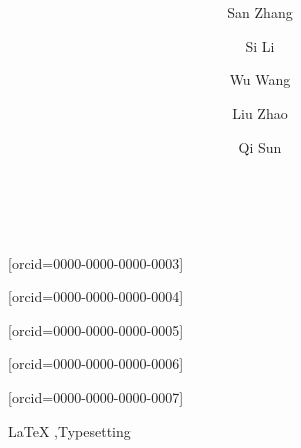 \documentclass[a4paper,fleqn]{cas-dc}
\begin{document}
\title[mode=title]{\ }

\author[1,2,3]{San Zhang}[orcid=0000-0000-0000-0003]\fnmark[1]

\author[1,2]{Si Li}[orcid=0000-0000-0000-0004]\fnmark[1]

\author[1]{Wu Wang}[orcid=0000-0000-0000-0005]

\author[1]{Liu Zhao}[orcid=0000-0000-0000-0006]\cormark[1]

\author[1]{Qi Sun}[orcid=0000-0000-0000-0007]\cormark[1]

\address[1]{Department/College/School/Faculty/Institute/... A, University A, City A, Country/Region A}
\address[2]{Department/College/School/Faculty/Institute/... B, University B, City B, Country/Region B}
\address[3]{Department/College/School/Faculty/Institute/... C, University C, City C, Country/Region C}


\begin{abstract}
	\ 
\end{abstract}

\begin{keywords}
	LaTeX \sep Typesetting
\end{keywords}

\maketitle








\printcredits



\end{document}
